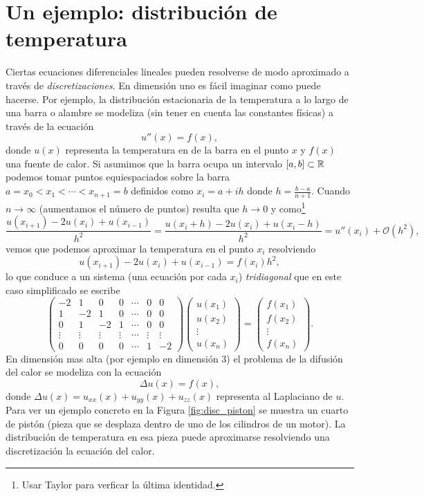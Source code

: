 \section{Un ejemplo: distribución de temperatura}
\label{sec:piston}
Ciertas ecuaciones diferenciales lineales  pueden resolverse de modo aproximado a través de \emph{discretizaciones}.
En dimensión uno es fácil imaginar como puede hacerse. Por ejemplo, la distribución estacionaria de la temperatura a lo largo de una barra o alambre se modeliza (sin  tener en cuenta las constantes físicas) a través de la ecuación
$$
u''(x)=f(x),
$$
donde $u(x)$ representa la temperatura en de la barra en el punto $x$ y $f(x)$ una fuente de calor. Si asumimos que la barra ocupa un intervalo $[a,b]\subset \mathbb R$ podemos tomar puntos equiespaciados sobre la barra
$a=x_0<x_1<\cdots <x_{n+1}=b$ definidos como $x_i=a+ih$ donde $h=\frac{b-a}{n+1}$. Cuando $n\to \infty$ (aumentamos el número de puntos) resulta que $h\to 0$ y como\footnote{Usar Taylor para verficar la última identidad.}
$$
\frac{u(x_{i+1})-2u(x_i)+u(x_{i-1})}{h^2}=
\frac{u(x_{i}+h)-2u(x_i)+u(x_{i}-h)}{h^2}=
u''(x_i)+\mathcal{O}(h^2),
$$
vemos que podemos aproximar la temperatura en el punto $x_i$ resolviendo
$$
u(x_{i+1})-2u(x_i)+u(x_{i-1})=f(x_i)h^2,
$$
lo que conduce a un sistema (una ecuación por cada $x_i$) \emph{tridiagonal} que en este caso simplificado se escribe
$$\begin{pmatrix}
-2&1&0&0&\cdots &0&0\\
1&-2&1&0&\cdots &0&0\\
0&1&-2&1&\cdots &0&0 \\
\vdots&\vdots&\vdots&\vdots&
\cdots &\vdots&\vdots\\
0&0&0&0&\cdots& 1&-2
\end{pmatrix}
\begin{pmatrix}
 u(x_1)\\
 u(x_2)\\
 \vdots\\
 u(x_n)
 \end{pmatrix}=
 \begin{pmatrix}
 f(x_1)\\
 f(x_2)\\
 \vdots\\
 f(x_n)
 \end{pmatrix}.
$$
En dimensión mas alta (por ejemplo en dimensión 3) el problema de la difusión del calor se modeliza con la ecuación
$$
\Delta u(x)=f(x),
$$
donde $\Delta u(x)=u_{xx}(x)+u_{yy}(x)+u_{zz}(x)$ representa al Laplaciano de $u$. Para ver un ejemplo concreto en la Figura \ref{fig:disc_piston} se muestra un cuarto de pistón (pieza que se desplaza dentro de uno de los cilindros de un motor). La distribución de temperatura en esa pieza puede aproximarse resolviendo una discretización la ecuación del calor.
